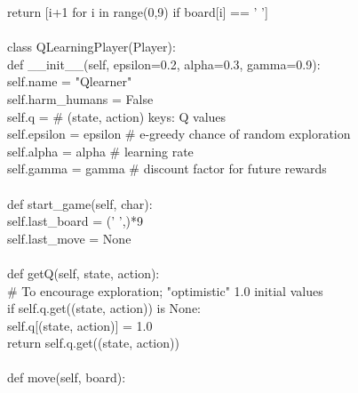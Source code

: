 \documentclass[a4paper, 12pt, notitlepage]{report}
\begin{document}
    \hspace*{8ex}    return [i+1 for i in range(0,9) if board[i] == ' ']\\
\\    
class QLearningPlayer(Player):\\
    \hspace*{4ex} def \_\_init\_\_(self, epsilon=0.2, alpha=0.3, gamma=0.9):\\
    \hspace*{8ex}    self.name = "Qlearner"\\
    \hspace*{8ex}    self.harm\_humans = False\\
    \hspace*{8ex}    self.q = {} \# (state, action) keys: Q values\\
    \hspace*{8ex}    self.epsilon = epsilon \# e-greedy chance of random exploration\\
    \hspace*{8ex}    self.alpha = alpha \# learning rate\\
    \hspace*{8ex}    self.gamma = gamma \# discount factor for future rewards\\
\\
    \hspace*{4ex} def start\_game(self, char):\\
    \hspace*{8ex}    self.last\_board = (' ',)*9\\
    \hspace*{8ex}    self.last\_move = None\\
\\
    \hspace*{4ex} def getQ(self, state, action):\\
    \hspace*{8ex}    \# To encourage exploration; "optimistic" 1.0 initial values\\
    \hspace*{8ex}    if self.q.get((state, action)) is None:\\
    \hspace*{12ex}        self.q[(state, action)] = 1.0\\
    \hspace*{8ex}    return self.q.get((state, action))\\
\\
    \hspace*{4ex} def move(self, board):\\
\end{document}
